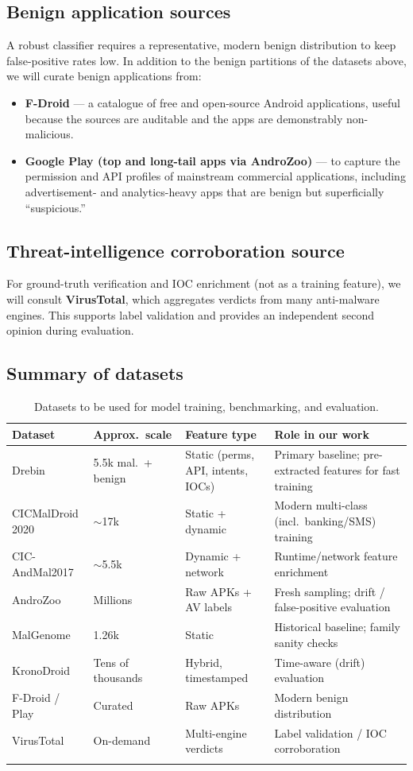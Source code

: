 \documentclass[11pt,a4paper]{article}
\newcommand{\dsname}[1]{\textbf{#1}}
\begin{document}
\subsection{Benign application sources}
A robust classifier requires a representative, modern benign distribution to keep
false-positive rates low. In addition to the benign partitions of the datasets above, we
will curate benign applications from:
\begin{itemize}
  \item \dsname{F-Droid} --- a catalogue of free and open-source Android applications,
  useful because the sources are auditable and the apps are demonstrably non-malicious.
  \item \dsname{Google Play (top and long-tail apps via AndroZoo)} --- to capture the
  permission and API profiles of mainstream commercial applications, including
  advertisement- and analytics-heavy apps that are benign but superficially
  ``suspicious.''
\end{itemize}

\subsection{Threat-intelligence corroboration source}
For ground-truth verification and IOC enrichment (not as a training feature), we will
consult \dsname{VirusTotal}, which aggregates verdicts from many anti-malware engines.
This supports label validation and provides an independent second opinion during
evaluation.

\subsection{Summary of datasets}
\begin{longtable}{p{3.0cm} p{2.0cm} p{3.0cm} p{4.5cm}}
\toprule
\textbf{Dataset} & \textbf{Approx.\ scale} & \textbf{Feature type} & \textbf{Role in our work}\\
\midrule
\endhead
Drebin & 5.5k mal.\ + benign & Static (perms, API, intents, IOCs) & Primary baseline; pre-extracted features for fast training\\
CICMalDroid 2020 & $\sim$17k & Static + dynamic & Modern multi-class (incl.\ banking/SMS) training\\
CIC-AndMal2017 & $\sim$5.5k & Dynamic + network & Runtime/network feature enrichment\\
AndroZoo & Millions & Raw APKs + AV labels & Fresh sampling; drift / false-positive evaluation\\
MalGenome & 1.26k & Static & Historical baseline; family sanity checks\\
KronoDroid & Tens of thousands & Hybrid, timestamped & Time-aware (drift) evaluation\\
F-Droid / Play & Curated & Raw APKs & Modern benign distribution\\
VirusTotal & On-demand & Multi-engine verdicts & Label validation / IOC corroboration\\
\bottomrule
\caption{Datasets to be used for model training, benchmarking, and evaluation.}
\end{longtable}
\end{document}
